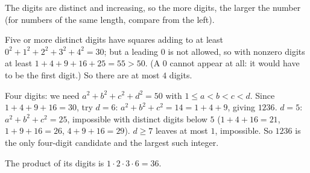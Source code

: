The digits are distinct and increasing, so the more digits, the larger the number (for numbers of the same length, compare from the left).

Five or more distinct digits have squares adding to at least $0^2+1^2+2^2+3^2+4^2=30$; but a leading $0$ is not allowed, so with nonzero digits at least $1+4+9+16+25=55>50$. (A $0$ cannot appear at all: it would have to be the first digit.) So there are at most $4$ digits.

Four digits: we need $a^2+b^2+c^2+d^2=50$ with $1\le a<b<c<d$. Since $1+4+9+16=30$, try $d=6$: $a^2+b^2+c^2=14=1+4+9$, giving $1236$. $d=5$: $a^2+b^2+c^2=25$, impossible with distinct digits below $5$ ($1+4+16=21$, $1+9+16=26$, $4+9+16=29$). $d\ge7$ leaves at most $1$, impossible. So $1236$ is the only four-digit candidate and the largest such integer.

The product of its digits is $1\cdot2\cdot3\cdot6=\boxed{36}$.
